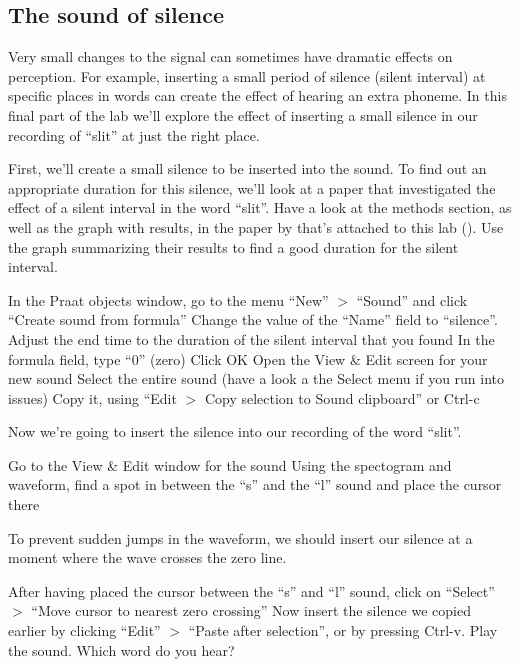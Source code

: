 \documentclass[a4paper, 9pt]{article}
\begin{document}
\subsection{The sound of silence}\label{the-sound-of-silence}

Very small changes to the signal can sometimes have dramatic effects on
perception. For example, inserting a small period of silence (silent
interval) at specific places in words can create the effect of hearing
an extra phoneme. In this final part of the lab we'll explore the effect
of inserting a small silence in our recording of ``slit'' at just the
right place.

First, we'll create a small silence to be inserted into the
 sound. To find out an appropriate duration for this
silence, we'll look at a paper that investigated the effect of a silent
interval in the word ``slit''. Have a look at the methods section, as
well as the graph with results, in the paper by \cite{Marcus1978} that's
attached to this lab (). Use the graph summarizing their
results to find a good duration for the silent interval.

\begin{exercise}
\action In the Praat objects window, go to the menu ``New'' $>$ ``Sound'' and click ``Create sound from formula''
\action Change the value of the ``Name'' field to ``silence''. 
\action Adjust the end time to the duration of the silent interval that you found
\action In the formula field, type ``0'' (zero)
\action Click OK
\action Open the View \& Edit screen for your new sound
\action Select the entire sound (have a look a the Select menu if you run into issues)
\action Copy it, using ``Edit $>$ Copy selection to Sound clipboard'' or Ctrl-c
\end{exercise}

Now we're going to insert the silence into our recording of the word
``slit''.

\begin{exercise}
\action Go to the View \& Edit window for the sound 
\action Using the spectogram and waveform, find a spot in between the ``s'' and the ``l'' sound and place the cursor there
\end{exercise}

To prevent sudden jumps in the waveform, we should insert our silence at
a moment where the wave crosses the zero line.

\begin{exercise}
\action After having placed the cursor between the ``s'' and ``l'' sound, click on ``Select'' $>$ ``Move cursor to nearest zero crossing''
\action Now insert the silence we copied earlier by clicking ``Edit'' $>$ ``Paste after selection'', or by pressing Ctrl-v.
\ask Play the sound. Which word do you hear?
\end{exercise}

\printbibliography
\end{document}
